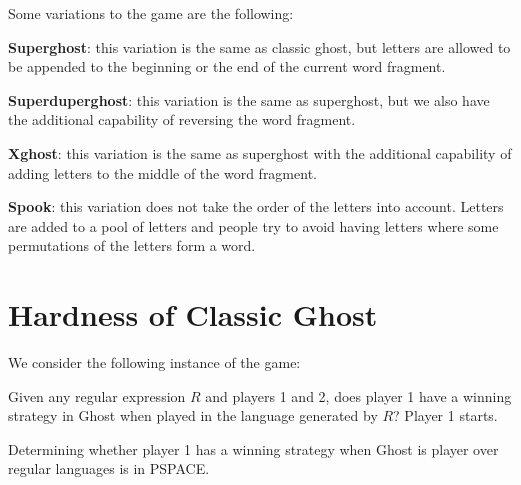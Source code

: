 \documentclass[runningheads,a4paper]{llncs}
\begin{document}
Some variations to the game are the following:

\textbf{Superghost}: this variation is the same as classic ghost, but letters are allowed to be appended to the beginning or the end of the current word fragment.

\textbf{Superduperghost}: this variation is the same as superghost, but we also have the additional capability of reversing the word fragment.

\textbf{Xghost}: this variation is the same as superghost with the additional capability of adding letters to the middle of the word fragment.

\textbf{Spook}: this variation does not take the order of the letters into account. Letters are added to a pool of letters and people try to avoid having letters where some permutations of the letters form a word.  

\section{Hardness of Classic Ghost}
\label{Hardness of Classic Ghost}

We consider the following instance of the game:

Given any regular expression $R$ and players 1 and 2, does player 1 have a winning strategy in Ghost when played in the language generated by $R$? Player 1 starts.

\begin{theorem}
Determining whether player 1 has a winning strategy when Ghost is player over regular languages is in PSPACE. 
\end{theorem}
\end{document}
